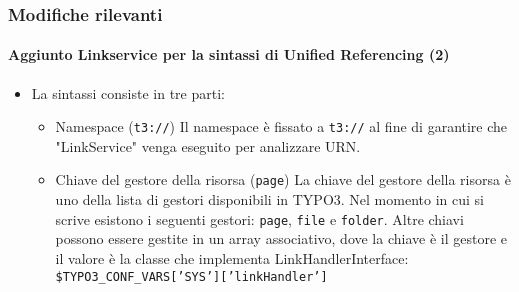 \begin{frame}[fragile]
	\frametitle{Modifiche rilevanti}
	\framesubtitle{Aggiunto Linkservice per la sintassi di Unified Referencing (2)}

	\begin{itemize}

		\item La sintassi consiste in tre parti:

			\begin{itemize}

				\item Namespace (\texttt{t3://})\newline
		   			Il namespace è fissato a \texttt{t3://} al fine di garantire che "LinkService" venga eseguito per analizzare URN.
					\newline
				\item Chiave del gestore della risorsa (\texttt{page})\newline
   					La chiave del gestore della risorsa è uno della lista di gestori disponibili in TYPO3.
					Nel momento in cui si scrive esistono i seguenti gestori: \texttt{page}, \texttt{file} e \texttt{folder}.\newline
					Altre chiavi possono essere gestite in un array associativo, dove la chiave è il gestore e il valore
					è la classe che implementa LinkHandlerInterface:\newline
					\texttt{\$TYPO3\_CONF\_VARS['SYS']['linkHandler']}

			\end{itemize}

	\end{itemize}

\end{frame}

